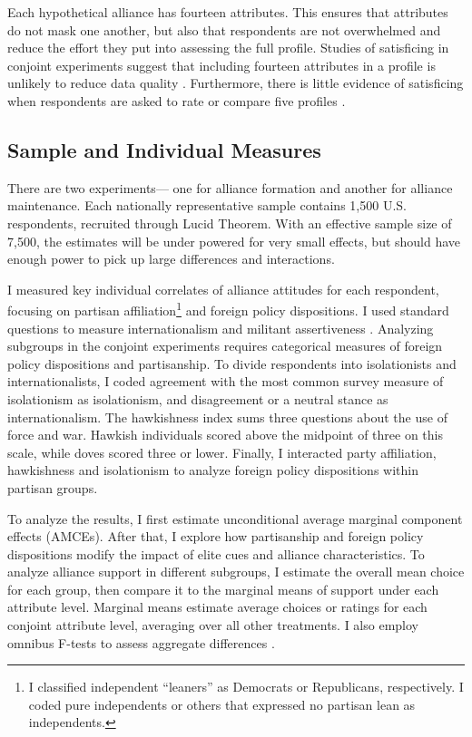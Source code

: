 \documentclass[12pt]{article}
\begin{document}
Each hypothetical alliance has fourteen attributes.
This ensures that attributes do not mask one another, but also that respondents are not overwhelmed and reduce the effort they put into assessing the full profile.
Studies of satisficing in conjoint experiments suggest that including fourteen attributes in a profile is unlikely to reduce data quality \citep{Bansaketal2019}. 
Furthermore, there is little evidence of satisficing when respondents are asked to rate or compare five profiles \citep{Bansaketal2018}.



\subsection{Sample and Individual Measures}


There are two experiments--- one for alliance formation and another for alliance maintenance. 
Each nationally representative sample contains 1,500 U.S. respondents, recruited through Lucid Theorem.
With an effective sample size of 7,500, the estimates will be under powered for very small effects, but should have enough power to pick up large differences and interactions. 


I measured key individual correlates of alliance attitudes for each respondent, focusing on partisan affiliation\footnote{I classified independent ``leaners'' as Democrats or Republicans, respectively. I coded pure independents or others that expressed no partisan lean as independents.} and foreign policy dispositions. 
I used standard questions to measure internationalism and militant assertiveness \citep{KertzerBrutger2016}.
Analyzing subgroups in the conjoint experiments requires categorical measures of foreign policy dispositions and partisanship. 
To divide respondents into isolationists and internationalists, I coded agreement with the most common survey measure of isolationism as isolationism, and disagreement or a neutral stance as internationalism. 
The hawkishness index sums three questions about the use of force and war. 
Hawkish individuals scored above the midpoint of three on this scale, while doves scored three or lower. 
Finally, I interacted party affiliation, hawkishness and isolationism to analyze foreign policy dispositions within partisan groups.


To analyze the results, I first estimate unconditional average marginal component effects (AMCEs).
After that, I explore how partisanship and foreign policy dispositions modify the impact of elite cues and alliance characteristics. 
To analyze alliance support in different subgroups, I estimate the overall mean choice for each group, then compare it to the marginal means of support under each attribute level.
Marginal means estimate average choices or ratings for each conjoint attribute level, averaging over all other treatments. 
I also employ omnibus F-tests to assess aggregate differences \citep{Leeperetal2020}. 
\end{document}
